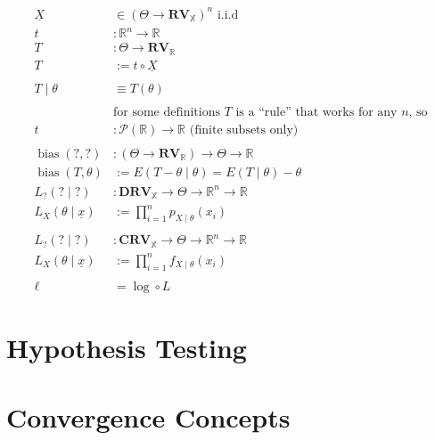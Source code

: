 \documentclass[12pt]{article}
\theoremstyle{definition}
\newcommand{\R}{\mathbb{R}}
\newcommand{\X}{\mathbb{X}}
\newcommand{\RV}{\mathbf{RV}}
\newcommand{\DRV}{\mathbf{DRV}}
\newcommand{\CRV}{\mathbf{CRV}}
\renewcommand{\P}{{\mathcal{P}}}
\DeclareMathOperator{\bias}{bias}
\begin{document}
\begin{align*}
  \underline{X} &\in (\Theta \to \RV_\X)^n\text{ i.i.d}\\
  t &: \R^n \to \R\\
  T &: \Theta \to \RV_\R\\
  T &:= t \circ \underline{X}\\
  \\
  T \mid \theta &\equiv T(\theta)\\
  \\
  &\text{for some definitions $T$ is a ``rule'' that works for any $n$, so}\\
  t &: \P(\R) \to \R\text{ (finite subsets only)}\\
  \\
  \bias(?, ?) &: (\Theta \to \RV_\R) \to \Theta \to \R\\
  \bias(T, \theta) &:= E(T - \theta \mid \theta) = E(T \mid \theta) - \theta
  \\
  L_{?}(? \mid ?) &: \DRV_\X \to \Theta \to \R^n \to \R\\
  L_X(\theta \mid \underline{x}) &:= \prod_{i = 1}^np_{X \mid \theta}(x_i)\\
  \\
  L_{?}(? \mid ?) &: \CRV_\X \to \Theta \to \R^n \to \R\\
  L_X(\theta \mid \underline{x}) &:= \prod_{i = 1}^nf_{X \mid \theta}(x_i)\\
  \\
  \ell &= \log \circ L
\end{align*}

\section{Hypothesis Testing}

\section{Convergence Concepts}
\end{document}
